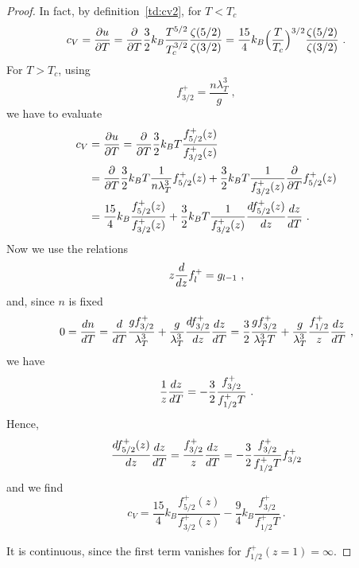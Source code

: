     \begin{proof}
        In fact, by definition~\eqref{td:cv2}, for $T < T_c$ 
        \begin{equation*}
            c_V = \frac{\partial u}{\partial T} = \frac{\partial}{\partial T} \frac{3}{2} k_B \frac{T^{5/2}}{T_c^{3/2}} \frac{\zeta(5/2)}{\zeta(3/2)} = \frac{15}{4} k_B \Big (\frac{T}{T_c} \Big )^{3/2} \frac{\zeta (5/2)}{\zeta (3/2)} ~.
        \end{equation*}
        For $T>T_c$, using 
        \begin{equation*}
            f^+_{3/2} = \frac{n \lambda_T^3}{g} ~,
        \end{equation*}
        we have to evaluate 
        \begin{equation*}
        \begin{aligned}
            c_V & = \frac{\partial u}{\partial T} = \frac{\partial}{\partial T} \frac{3}{2} k_B T \frac{f^+_{5/2} (z)}{f^+_{3/2} (z)} \\ & = \frac{\partial}{\partial T} \frac{3}{2} k_B T \frac{1}{n \lambda_T^3} f^+_{5/2} (z) + \frac{3}{2} k_B T \frac{1}{f^+_{3/2} (z)} \frac{\partial}{\partial T} f^+_{5/2} (z) \\ & = \frac{15}{4} k_B \frac{f^+_{5/2} (z)}{f^+_{3/2} (z)} + \frac{3}{2} k_B T \frac{1}{f^+_{3/2} (z)} \frac{df^+_{5/2} (z)}{dz} \frac{dz}{dT} ~. 
        \end{aligned}
        \end{equation*}
        Now we use the relations 
        \begin{equation*}
            z \frac{d}{dz} f^+_l = g_{l-1} ~,
        \end{equation*}
        and, since $n$ is fixed
        \begin{equation*}
            0 = \frac{dn}{dT} = \frac{d}{dT} \frac{g f^+_{3/2}}{\lambda_T^3} + \frac{g}{\lambda_T^3} \frac{df^+_{3/2}}{dz} \frac{dz}{dT} = \frac{3}{2} \frac{g f^+_{3/2}}{\lambda_T^3 T} + \frac{g}{\lambda_T^3} \frac{f^+_{1/2}}{z} \frac{dz}{dT} ~,
        \end{equation*}
        we have 
        \begin{equation*}
            \frac{1}{z} \frac{dz}{dT} = - \frac{3}{2} \frac{f^+_{3/2}}{f^+_{1/2} T} ~.
        \end{equation*}
        Hence, 
        \begin{equation*}
            \frac{df^+_{5/2} (z)}{dz} \frac{dz}{dT} = \frac{f^+_{3/2}}{z} \frac{dz}{dT} = - \frac{3}{2} \frac{f^+_{3/2}}{f^+_{1/2} T}  f^+_{3/2} 
        \end{equation*}
        and we find 
        \begin{equation*}
            c_V = \frac{15}{4} k_B \frac{f^+_{5/2} (z)}{f^+_{3/2} (z)} - \frac{9}{4} k_B \frac{f^+_{3/2}}{f^+_{1/2} T} ~.
        \end{equation*}

        It is continuous, since the first term vanishes for $f^+_{1/2} (z = 1) = \infty$.
    \end{proof}

